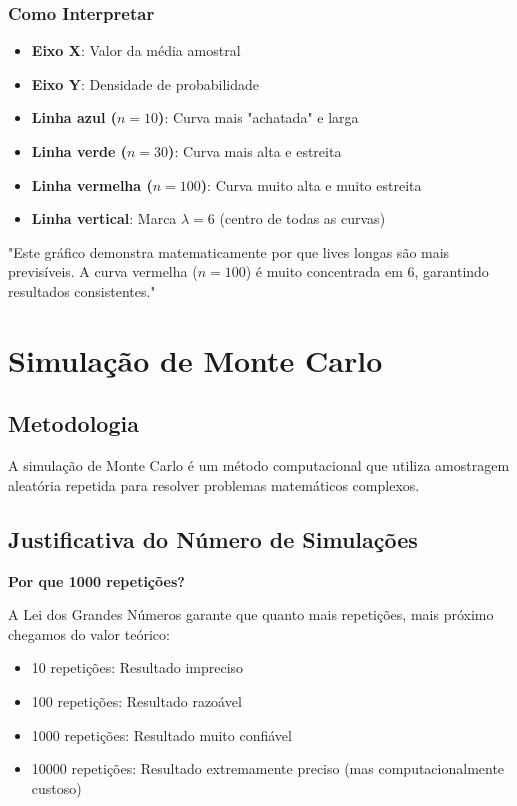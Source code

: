 \documentclass[12pt,a4paper]{article}
\begin{document}
\subsubsection{Como Interpretar}
\begin{itemize}
    \item \textbf{Eixo X}: Valor da média amostral
    \item \textbf{Eixo Y}: Densidade de probabilidade
    \item \textbf{Linha azul ($n=10$)}: Curva mais "achatada" e larga
    \item \textbf{Linha verde ($n=30$)}: Curva mais alta e estreita
    \item \textbf{Linha vermelha ($n=100$)}: Curva muito alta e muito estreita
    \item \textbf{Linha vertical}: Marca $\lambda = 6$ (centro de todas as curvas)
\end{itemize}

\begin{aplicacao}
"Este gráfico demonstra matematicamente por que lives longas são mais previsíveis. A curva vermelha ($n=100$) é muito concentrada em 6, garantindo resultados consistentes."
\end{aplicacao}

\section{Simulação de Monte Carlo}

\subsection{Metodologia}

A simulação de Monte Carlo é um método computacional que utiliza amostragem aleatória repetida para resolver problemas matemáticos complexos.


\subsection{Justificativa do Número de Simulações}

\begin{importante}
\textbf{Por que 1000 repetições?}

A Lei dos Grandes Números garante que quanto mais repetições, mais próximo chegamos do valor teórico:
\begin{itemize}
    \item 10 repetições: Resultado impreciso
    \item 100 repetições: Resultado razoável
    \item 1000 repetições: Resultado muito confiável
    \item 10000 repetições: Resultado extremamente preciso (mas computacionalmente custoso)
\end{itemize}
\end{importante}
\end{document}
